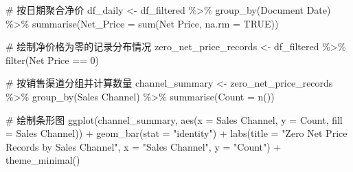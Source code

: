 \documentclass[
  letterpaper,
  DIV=11,
  numbers=noendperiod]{scrartcl}
\newenvironment{Shaded}{\begin{snugshade}}{\end{snugshade}}
\newcommand{\AttributeTok}[1]{\textcolor[rgb]{0.40,0.45,0.13}{#1}}
\newcommand{\CommentTok}[1]{\textcolor[rgb]{0.37,0.37,0.37}{#1}}
\newcommand{\ConstantTok}[1]{\textcolor[rgb]{0.56,0.35,0.01}{#1}}
\newcommand{\DecValTok}[1]{\textcolor[rgb]{0.68,0.00,0.00}{#1}}
\newcommand{\FunctionTok}[1]{\textcolor[rgb]{0.28,0.35,0.67}{#1}}
\newcommand{\NormalTok}[1]{\textcolor[rgb]{0.00,0.23,0.31}{#1}}
\newcommand{\OtherTok}[1]{\textcolor[rgb]{0.00,0.23,0.31}{#1}}
\newcommand{\SpecialCharTok}[1]{\textcolor[rgb]{0.37,0.37,0.37}{#1}}
\newcommand{\StringTok}[1]{\textcolor[rgb]{0.13,0.47,0.30}{#1}}
\begin{document}
\begin{Shaded}
\begin{Highlighting}[]
\CommentTok{\# 按日期聚合净价}
\NormalTok{df\_daily }\OtherTok{\textless{}{-}}\NormalTok{ df\_filtered }\SpecialCharTok{\%\textgreater{}\%}
  \FunctionTok{group\_by}\NormalTok{(}\StringTok{\textasciigrave{}}\AttributeTok{Document Date}\StringTok{\textasciigrave{}}\NormalTok{) }\SpecialCharTok{\%\textgreater{}\%}
  \FunctionTok{summarise}\NormalTok{(}\AttributeTok{Net\_Price =} \FunctionTok{sum}\NormalTok{(}\StringTok{\textasciigrave{}}\AttributeTok{Net Price}\StringTok{\textasciigrave{}}\NormalTok{, }\AttributeTok{na.rm =} \ConstantTok{TRUE}\NormalTok{))}

\CommentTok{\# 绘制净价格为零的记录分布情况}
\NormalTok{zero\_net\_price\_records }\OtherTok{\textless{}{-}}\NormalTok{ df\_filtered }\SpecialCharTok{\%\textgreater{}\%}
  \FunctionTok{filter}\NormalTok{(}\StringTok{\textasciigrave{}}\AttributeTok{Net Price}\StringTok{\textasciigrave{}} \SpecialCharTok{==} \DecValTok{0}\NormalTok{)}

\CommentTok{\# 按销售渠道分组并计算数量}
\NormalTok{channel\_summary }\OtherTok{\textless{}{-}}\NormalTok{ zero\_net\_price\_records }\SpecialCharTok{\%\textgreater{}\%}
  \FunctionTok{group\_by}\NormalTok{(}\StringTok{\textasciigrave{}}\AttributeTok{Sales Channel}\StringTok{\textasciigrave{}}\NormalTok{) }\SpecialCharTok{\%\textgreater{}\%}
  \FunctionTok{summarise}\NormalTok{(}\AttributeTok{Count =} \FunctionTok{n}\NormalTok{())}

\CommentTok{\# 绘制条形图}
\FunctionTok{ggplot}\NormalTok{(channel\_summary, }\FunctionTok{aes}\NormalTok{(}\AttributeTok{x =} \StringTok{\textasciigrave{}}\AttributeTok{Sales Channel}\StringTok{\textasciigrave{}}\NormalTok{, }\AttributeTok{y =}\NormalTok{ Count, }\AttributeTok{fill =} \StringTok{\textasciigrave{}}\AttributeTok{Sales Channel}\StringTok{\textasciigrave{}}\NormalTok{)) }\SpecialCharTok{+}
  \FunctionTok{geom\_bar}\NormalTok{(}\AttributeTok{stat =} \StringTok{"identity"}\NormalTok{) }\SpecialCharTok{+}
  \FunctionTok{labs}\NormalTok{(}\AttributeTok{title =} \StringTok{"Zero Net Price Records by Sales Channel"}\NormalTok{,}
       \AttributeTok{x =} \StringTok{"Sales Channel"}\NormalTok{, }\AttributeTok{y =} \StringTok{"Count"}\NormalTok{) }\SpecialCharTok{+}
  \FunctionTok{theme\_minimal}\NormalTok{()}
\end{Highlighting}
\end{Shaded}
\end{document}
